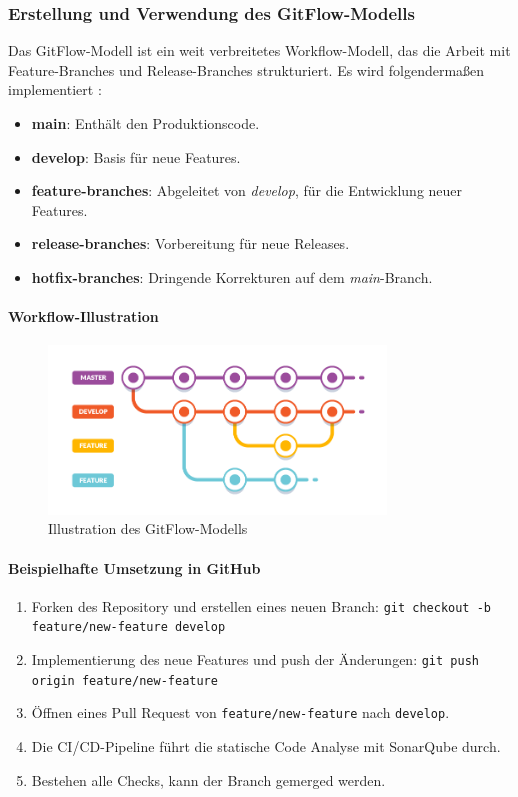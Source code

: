 \subsubsection{Erstellung und Verwendung des GitFlow-Modells}

Das GitFlow-Modell ist ein weit verbreitetes Workflow-Modell, das die Arbeit mit Feature-Branches und Release-Branches strukturiert. Es wird folgendermaßen implementiert \cite{Driessen2010}:

\begin{itemize}
    \item \textbf{main}: Enthält den Produktionscode.
    \item \textbf{develop}: Basis für neue Features.
    \item \textbf{feature-branches}: Abgeleitet von \textit{develop}, für die Entwicklung neuer Features.
    \item \textbf{release-branches}: Vorbereitung für neue Releases.
    \item \textbf{hotfix-branches}: Dringende Korrekturen auf dem \textit{main}-Branch.
\end{itemize}

\paragraph{Workflow-Illustration}

\begin{figure}[h!]
\centering
\includegraphics[width=0.8\textwidth]{img/gitflow_workflow.png}
\caption{Illustration des GitFlow-Modells}
\label{fig:gitflow}
\end{figure}

\paragraph{Beispielhafte Umsetzung in GitHub}

\begin{enumerate}
    \item Forken des Repository und erstellen eines neuen Branch: \texttt{git checkout -b feature/new-feature develop}
    \item Implementierung des neue Features und push der Änderungen: \texttt{git push origin feature/new-feature}
    \item Öffnen eines Pull Request von \texttt{feature/new-feature} nach \texttt{develop}.
    \item Die CI/CD-Pipeline führt die statische Code Analyse mit SonarQube durch.
    \item Bestehen alle Checks, kann der Branch gemerged werden.
\end{enumerate}


